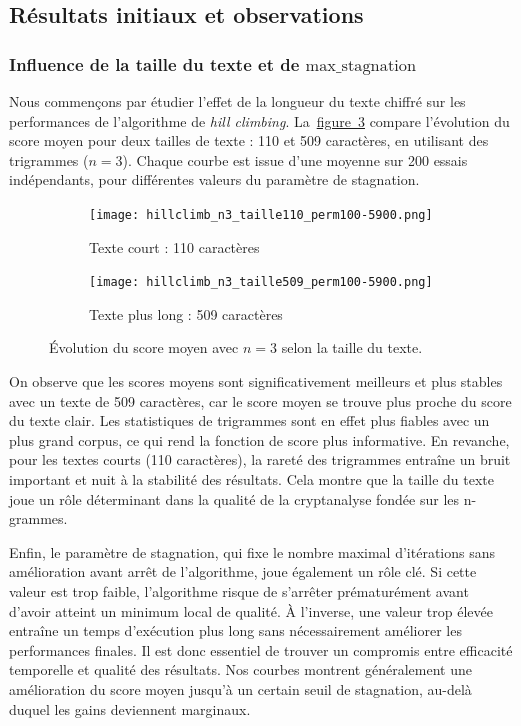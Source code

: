\documentclass[a4paper]{article}
\newcommand{\figref}[1]{\hyperref[#1]{figure~\ref*{#1}}}
\begin{document}
\subsection{Résultats initiaux et observations}

\subsubsection{Influence de la taille du texte et de \(\text{max\_stagnation}\)}

Nous commençons par étudier l’effet de la longueur du texte chiffré sur les performances de l’algorithme de \textit{hill climbing}. La~\figref{fig:n3-tailles} compare l’évolution du score moyen pour deux tailles de texte : 110 et 509 caractères, en utilisant des trigrammes ($n = 3$). Chaque courbe est issue d’une moyenne sur 200 essais indépendants, pour différentes valeurs du paramètre de stagnation.

\begin{figure}[H]
    \centering
    \begin{subfigure}[b]{0.49\textwidth}
        \texttt{[image: hillclimb\_n3\_taille110\_perm100-5900.png]}
        \caption{Texte court : 110 caractères}
        \label{fig:n3-110}
    \end{subfigure}
    \hfill
    \begin{subfigure}[b]{0.49\textwidth}
        \texttt{[image: hillclimb\_n3\_taille509\_perm100-5900.png]}
        \caption{Texte plus long : 509 caractères}
        \label{fig:n3-509}
    \end{subfigure}
    \caption{Évolution du score moyen avec $n = 3$ selon la taille du texte.}
    \label{fig:n3-tailles}
\end{figure}

On observe que les scores moyens sont significativement meilleurs et plus stables avec un texte
de 509 caractères, car le score moyen se trouve plus proche du score du texte clair. Les statistiques
de trigrammes sont en effet plus fiables avec un plus grand corpus, ce qui rend la fonction de score
plus informative. En revanche, pour les textes courts (110 caractères), la rareté des trigrammes
entraîne un bruit important et nuit à la stabilité des résultats. Cela montre que la taille du texte
joue un rôle déterminant dans la qualité de la cryptanalyse fondée sur les n-grammes.

Enfin, le paramètre de stagnation, qui fixe le nombre maximal d’itérations sans amélioration
avant arrêt de l’algorithme, joue également un rôle clé. Si cette valeur est trop faible, l’algorithme
risque de s’arrêter prématurément avant d’avoir atteint un minimum local de qualité. À l’inverse,
une valeur trop élevée entraîne un temps d’exécution plus long sans nécessairement améliorer les
performances finales. Il est donc essentiel de trouver un compromis entre efficacité temporelle et
qualité des résultats. Nos courbes montrent généralement une amélioration du score moyen jusqu’à
un certain seuil de stagnation, au-delà duquel les gains deviennent marginaux.
\end{document}
